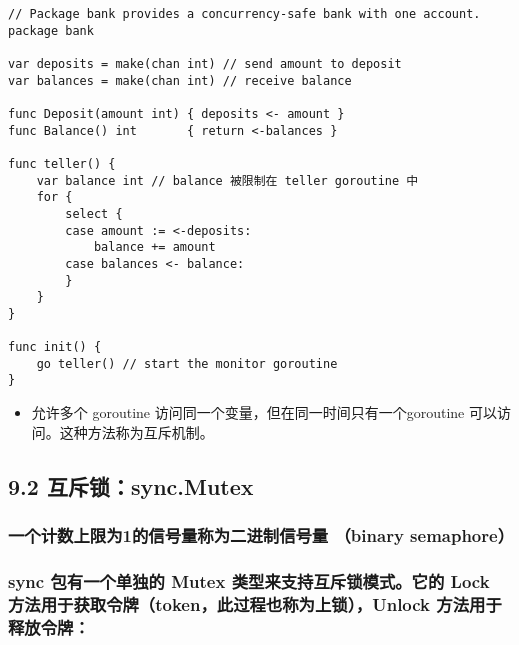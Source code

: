 \begin{verbatim}
// Package bank provides a concurrency-safe bank with one account.
package bank

var deposits = make(chan int) // send amount to deposit
var balances = make(chan int) // receive balance

func Deposit(amount int) { deposits <- amount }
func Balance() int       { return <-balances }

func teller() {
    var balance int // balance 被限制在 teller goroutine 中
    for {
        select {
        case amount := <-deposits:
            balance += amount
        case balances <- balance:
        }
    }
}

func init() {
    go teller() // start the monitor goroutine
}
\end{verbatim}

\begin{itemize}
\tightlist
\item
  允许多个 goroutine 访问同一个变量，但在同一时间只有一个goroutine
  可以访问。这种方法称为互斥机制。
\end{itemize}

\hypertarget{ux4e92ux65a5ux9501sync.mutex}{%
\subsection{9.2 互斥锁：sync.Mutex}\label{ux4e92ux65a5ux9501sync.mutex}}

\hypertarget{ux4e00ux4e2aux8ba1ux6570ux4e0aux9650ux4e3a1ux7684ux4fe1ux53f7ux91cfux79f0ux4e3aux4e8cux8fdbux5236ux4fe1ux53f7ux91cf-binary-semaphore}{%
\subsubsection{一个计数上限为1的信号量称为二进制信号量 （binary
semaphore）}\label{ux4e00ux4e2aux8ba1ux6570ux4e0aux9650ux4e3a1ux7684ux4fe1ux53f7ux91cfux79f0ux4e3aux4e8cux8fdbux5236ux4fe1ux53f7ux91cf-binary-semaphore}}

\hypertarget{sync-ux5305ux6709ux4e00ux4e2aux5355ux72ecux7684-mutex-ux7c7bux578bux6765ux652fux6301ux4e92ux65a5ux9501ux6a21ux5f0fux5b83ux7684-lock-ux65b9ux6cd5ux7528ux4e8eux83b7ux53d6ux4ee4ux724ctokenux6b64ux8fc7ux7a0bux4e5fux79f0ux4e3aux4e0aux9501unlock-ux65b9ux6cd5ux7528ux4e8eux91caux653eux4ee4ux724c}{%
\subsubsection{sync 包有一个单独的 Mutex 类型来支持互斥锁模式。它的 Lock
方法用于获取令牌（token，此过程也称为上锁），Unlock
方法用于释放令牌：}\label{sync-ux5305ux6709ux4e00ux4e2aux5355ux72ecux7684-mutex-ux7c7bux578bux6765ux652fux6301ux4e92ux65a5ux9501ux6a21ux5f0fux5b83ux7684-lock-ux65b9ux6cd5ux7528ux4e8eux83b7ux53d6ux4ee4ux724ctokenux6b64ux8fc7ux7a0bux4e5fux79f0ux4e3aux4e0aux9501unlock-ux65b9ux6cd5ux7528ux4e8eux91caux653eux4ee4ux724c}}

